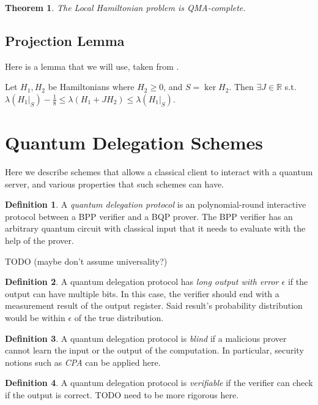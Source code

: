 \documentclass{article}
\newtheorem{theorem}{Theorem}[section]
\theoremstyle{definition}
\newtheorem{definition}{Definition}[section]
\begin{document}
\begin{theorem}
	The Local Hamiltonian problem is QMA-complete.
\end{theorem}

\subsection{Projection Lemma}

Here is a lemma that we will use, taken from \cite{kempe_kitaev_regev_2006}.

Let $H_1, H_2$ be Hamiltonians where $H_2\geq0$, and $S=\ker H_2$.
Then $\exists J\in\mathbb{R}$ s.t.
$\lambda(H_1\big|_S)-\frac{1}{8}\leq
	\lambda(H_1+JH_2)\leq\lambda(H_1\big|_S)$.

\section{Quantum Delegation Schemes}

Here we describe schemes that allows a classical client to interact with a quantum server, and various properties that such schemes can have.

\begin{definition}
	A \emph{quantum delegation protocol} is an polynomial-round interactive protocol between a BPP verifier and a BQP prover. The BPP verifier has an arbitrary quantum circuit with classical input that it needs to evaluate with the help of the prover.
\end{definition}

TODO (maybe don't assume universality?)

\begin{definition}
	A quantum delegation protocol has \emph{long output with error $\epsilon$} if the output can have multiple bits. In this case, the verifier should end with a measurement result of the output register. Said result's probability distribution would be within $\epsilon$ of the true distribution.
\end{definition}

\begin{definition}
	A quantum delegation protocol is \emph{blind} if a malicious prover cannot learn the input or the output of the computation. In particular, security notions such as \emph{CPA} can be applied here.
\end{definition}

\begin{definition}
	A quantum delegation protocol is \emph{verifiable} if the verifier can check if the output is correct. TODO need to be more rigorous here.
\end{definition}
\end{document}
